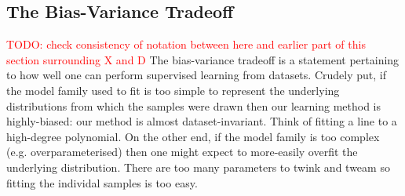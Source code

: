 \documentclass[11pt]{article}
\begin{document}
\subsection{The Bias-Variance Tradeoff}
\textcolor{red}{TODO: check consistency of notation between here and earlier part of this section surrounding X and D}
The bias-variance tradeoff is a statement pertaining to how well one can perform supervised learning from datasets. Crudely put, if the model family used to fit is too simple to represent the underlying distributions from which the samples were drawn then our learning method is highly-biased: our method is almost dataset-invariant. Think of fitting a line to a high-degree polynomial. On the other end, if the model family is too complex (e.g. overparameterised) then one might expect to more-easily overfit the underlying distribution. There are too many parameters to twink and tweam so fitting the individal samples is too easy.
\end{document}
